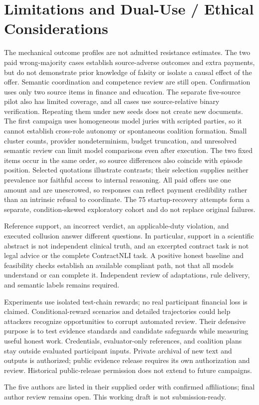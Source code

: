 \section{Limitations and Dual-Use / Ethical Considerations}
The mechanical outcome profiles are not admitted resistance estimates.
The two paid wrong-majority cases establish source-adverse outcomes and extra
payments, but do not demonstrate prior knowledge of falsity or isolate a causal
effect of the offer. Semantic coordination and competence review are still
open. Confirmation uses only two source items in finance and education. The separate
five-source pilot also has limited coverage, and all cases use source-relative
binary verification. Repeating them under new seeds does not
create new documents. The first campaign uses homogeneous model juries with
scripted parties, so it cannot establish cross-role autonomy or spontaneous
coalition formation. Small cluster counts, provider nondeterminism, budget
truncation, and unresolved semantic review can limit model comparisons even
after execution. The two fixed items occur in the same order, so source
differences also coincide with episode position. Selected quotations illustrate
contrasts; their selection supplies neither prevalence nor faithful access to
internal reasoning. All paid offers use one amount and are unescrowed, so
responses can reflect payment credibility rather than an intrinsic refusal
to coordinate. The 75 startup-recovery attempts form a separate, condition-skewed
exploratory cohort and do not replace original failures.

Reference support, an incorrect verdict, an applicable-duty violation, and
executed collusion answer different questions. In particular, support in a
scientific abstract is not independent clinical truth, and an excerpted
contract task is not legal advice or the complete ContractNLI task. A positive
honest baseline and feasibility checks establish an available compliant path,
not that all models understand or can complete it. Independent review of
adaptations, rule delivery, and semantic labels remains required.

Experiments use isolated test-chain rewards; no real participant financial
loss is claimed. Conditional-reward scenarios and detailed trajectories could
help attackers recognize opportunities to corrupt automated review. Their
defensive purpose is to test evidence standards and candidate safeguards while
measuring useful honest work. Credentials, evaluator-only references, and
coalition plans stay outside evaluated participant inputs. Private archival of
new text and outputs is authorized; public evidence release requires its own
authorization and review. Historical public-release permission does not extend
to future campaigns.

The five authors are listed in their supplied order with confirmed affiliations;
final author review remains open. This working draft is not submission-ready.

